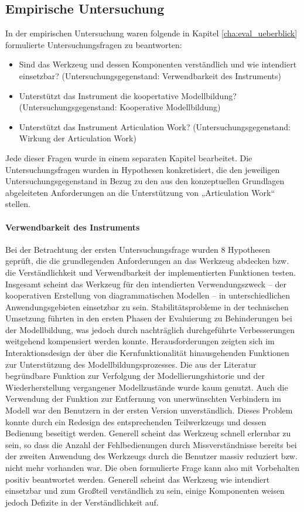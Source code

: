 \subsection{Empirische Untersuchung}

In der empirischen Untersuchung waren folgende in Kapitel \ref{cha:eval_ueberblick} formulierte Untersuchungsfragen zu beantworten:

\begin{itemize}
 \item Sind das Werkzeug und dessen Komponenten verständlich und wie intendiert einsetzbar? (Untersuchungsgegenstand: Verwendbarkeit des Instruments)
 \item Unterstützt das Instrument die koopertative Modellbildung? (Untersuchungsgegenstand: Kooperative Modellbildung)
 \item Unterstützt das Instrument Articulation Work? (Untersuchungsgegenstand: Wirkung der Articulation Work)
\end{itemize}

Jede dieser Fragen wurde in einem separaten Kapitel bearbeitet. Die Untersuchungsfragen wurden in Hypothesen konkretisiert, die den jeweiligen Untersuchungsgegenstand in Bezug zu den aus den konzeptuellen Grundlagen abgeleiteten Anforderungen an die Unterstützung von „Articulation Work“ stellen.

\paragraph{Verwendbarkeit des Instruments} %
Bei der Betrachtung der ersten Untersuchungsfrage wurden 8 Hypothesen geprüft, die die grundlegenden Anforderungen an das Werkzeug abdecken bzw. die Verständlichkeit und Verwendbarkeit der implementierten Funktionen testen. Insgesamt scheint das Werkzeug für den intendierten Verwendungszweck -- der kooperativen Erstellung von diagrammatischen Modellen -- in unterschiedlichen Anwendungsgebieten einsetzbar zu sein. Stabilitätsprobleme in der technischen Umsetzung führten in den ersten Phasen der Evaluierung zu Behinderungen bei der Modellbildung, was jedoch durch nachträglich durchgeführte Verbesserungen weitgehend kompensiert werden konnte. Herausforderungen zeigten sich im Interaktionsdesign der über die Kernfunktionalität hinausgehenden Funktionen zur Unterstützung des Modellbildungsprozesses. Die aus der Literatur begründbare Funktion zur Verfolgung der Modellierungshistorie und der Wiederherstellung vergangener Modellzustände wurde kaum genutzt. Auch die Verwendung der Funktion zur Entfernung von unerwünschten Verbindern im Modell war den Benutzern in der ersten Version unverständlich. Dieses Problem konnte durch ein Redesign des entsprechenden Teilwerkzeugs und dessen Bedienung beseitigt werden. Generell scheint das Werkzeug schnell erlernbar zu sein, so dass die Anzahl der Fehlbedienungen durch Missverständnisse bereits bei der zweiten Anwendung des Werkzeugs durch die Benutzer massiv reduziert bzw. nicht mehr vorhanden war. Die oben formulierte Frage kann also mit Vorbehalten positiv beantwortet werden. Generell scheint das Werkzeug wie intendiert einsetzbar und zum Großteil verständlich zu sein, einige Komponenten weisen jedoch Defizite in der Verständlichkeit auf.

